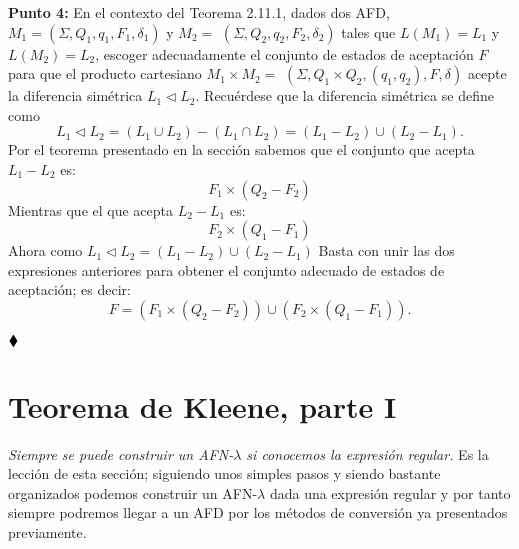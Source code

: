 \textbf{Punto 4: }En el contexto del Teorema 2.11.1, dados dos AFD, $M_1=\left(\Sigma, Q_1, q_1, F_1, \delta_1\right)$ y $M_2=$ $\left(\Sigma, Q_2, q_2, F_2, \delta_2\right)$ tales que $L\left(M_1\right)=L_1$ y $L\left(M_2\right)=L_2$, escoger adecuadamente el conjunto de estados de aceptación $F$ para que el producto cartesiano $M_1 \times M_2=$ $\left(\Sigma, Q_1 \times Q_2,\left(q_1, q_2\right), F, \delta\right)$ acepte la diferencia simétrica $L_1 \triangleleft L_2$. Recuérdese que la diferencia simétrica se define como
$$
L_1 \triangleleft L_2=\left(L_1 \cup L_2\right)-\left(L_1 \cap L_2\right)=\left(L_1-L_2\right) \cup\left(L_2-L_1\right) .
$$
Por el teorema presentado en la sección sabemos que el conjunto que acepta $L_1-L_2$ es:
$$F_1\times(Q_2-F_2)$$
Mientras que el que acepta $L_2-L_1$ es:
$$F_2\times(Q_1-F_1)$$
Ahora como $L_1\triangleleft L_2=(L_1-L_2)\cup(L_2-L_1)$ Basta con unir las dos expresiones anteriores para obtener el conjunto adecuado de estados de aceptación; es decir:
$$F=(F_1\times(Q_2-F_2))\cup(F_2\times(Q_1-F_1)).$$

$\hfill \blacklozenge$

\section{Teorema de Kleene, parte I}

\textit{Siempre se puede construir un AFN-$\lambda$ si conocemos la expresión regular.} Es la lección de esta sección; siguiendo unos simples pasos y siendo bastante organizados podemos construir un AFN-$\lambda$ dada una expresión regular y por tanto siempre podremos llegar a un AFD por los métodos de conversión ya presentados previamente.\\

